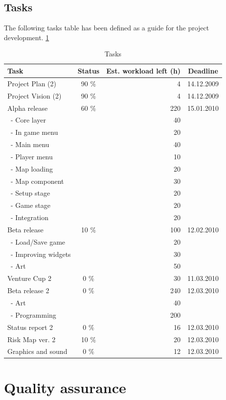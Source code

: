 \documentclass[12pt,a4paper]{article}
\begin{document}
\subsection{Tasks}

The following tasks table has been defined as a guide for the project development. \ref{tab:tasks}

\begin{table}[h!]
\small
\begin{tabular}{ l | c | r | c}
Task				&Status		&Est. workload left (h)	&Deadline \\\hline\hline
Project Plan (2) 	&90	\%		&4					&14.12.2009\\
Project Vision (2)	&90 	\%		&4					&14.12.2009\\
Alpha release		&60 	\%		&220				&15.01.2010\\
\ - Core layer		&			&40					&\\
\ - In game menu	&			&20					&\\
\ - Main menu		&			&40					&\\
\ - Player menu		&			&10					&\\
\ - Map loading		&			&20					&\\
\ - Map component	&			&30					&\\
\ - Setup stage		&			&20					&\\
\ - Game stage		&			&20					&\\
\ - Integration		&			&20					&\\
Beta release		&10 \%		&100				&12.02.2010\\
\ - Load/Save game	&			&20					&\\
\ - Improving widgets	&			&30					&\\
\ - Art				&			&50					&\\
Venture Cup 2		&0 \%		&30					&11.03.2010\\
Beta release 2		&0 \%		&240				&12.03.2010\\
\ - Art				&			&40					&\\
\ - Programming	&			&200				&\\
Status report 2		&0 \%		&16					&12.03.2010\\
Risk Map ver. 2		&10 \%		&20					&12.03.2010\\
Graphics and sound	&0 \%		&12					&12.03.2010
\end{tabular}
\caption{Tasks}
\label{tab:tasks}
\end{table}


\section{Quality assurance}
\end{document}
